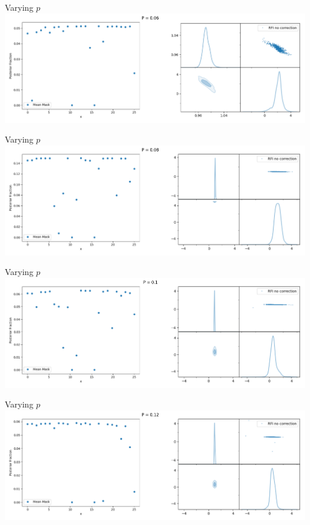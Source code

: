 \documentclass[aspectratio=169]{beamer}
\begin{document}
\begin{frame}{Varying $p$}
    \centering
    \includegraphics[width=\textwidth]{images/gif_anest/comb_4.png}
\end{frame}

\begin{frame}{Varying $p$}
    \centering
    \includegraphics[width=\textwidth]{images/gif_anest/comb_5.png}
\end{frame}

\begin{frame}{Varying $p$}
    \centering
    \includegraphics[width=\textwidth]{images/gif_anest/comb_6.png}
\end{frame}

\begin{frame}{Varying $p$}
    \centering
    \includegraphics[width=\textwidth]{images/gif_anest/comb_7.png}
\end{frame}
\end{document}
